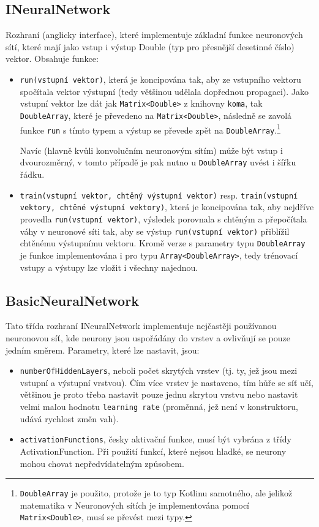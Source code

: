 \documentclass[12pt]{report}			%
\begin{document}
				\subsection{INeuralNetwork}
					Rozhraní (anglicky \gls{interface}), které implementuje základní funkce neuronových sítí, které mají jako vstup i výstup Double (typ pro přesnější desetinné číslo) vektor. Obsahuje funkce:
					\begin{itemize}
						\item \verb!run(vstupní vektor)!, která je koncipována tak, aby ze vstupního vektoru spočítala vektor výstupní (tedy většinou udělala dopřednou propagaci). Jako vstupní vektor lze dát jak \verb!Matrix<Double>! z knihovny \verb!koma!, tak \verb!DoubleArray!, které je převedeno na \verb!Matrix<Double>!, následně se zavolá funkce \verb!run! s tímto typem a výstup se převede zpět na \verb!DoubleArray!.\footnote{\verb!DoubleArray! je použito, protože je to typ Kotlinu samotného, ale jelikož matematika v Neuronových sítích je implementována pomocí \verb!Matrix<Double>!, musí se převést mezi typy.}
						
						Navíc (hlavně kvůli konvolučním neuronovým sítím) může být vstup i dvourozměrný, v tomto případě je pak nutno u \verb!DoubleArray! uvést i šířku řádku.
						\item \verb!train(vstupní vektor, chtěný výstupní vektor)! resp. \verb!train(vstupní vektory, chtěné výstupní vektory)!, která je koncipována tak, aby nejdříve provedla \verb!run(vstupní vektor)!, výsledek porovnala s chtěným a přepočítala váhy v neuronové síti tak, aby se výstup \verb!run(vstupní vektor)! přiblížil chtěnému výstupnímu vektoru. Kromě verze s parametry typu \verb!DoubleArray! je funkce implementována i pro typu \verb!Array<DoubleArray>!, tedy trénovací vstupy a výstupy lze vložit i všechny najednou.
					\end{itemize}
			
				\subsection{BasicNeuralNetwork}
					Tato třída rozhraní INeuralNetwork implementuje nejčastěji používanou neuronovou síť, kde neurony jsou uspořádány do vrstev a ovlivňují se pouze jedním směrem. Parametry, které lze nastavit, jsou:
					\begin{itemize}
						\item \verb!numberOfHiddenLayers!, neboli počet skrytých vrstev (tj. ty, jež jsou mezi vstupní a výstupní vrstvou). Čím více vrstev je nastaveno, tím hůře se síť učí, většinou je proto třeba nastavit pouze jednu skrytou vrstvu nebo nastavit velmi malou hodnotu \verb!learning rate! (proměnná, jež není v konstruktoru, udává rychlost změn vah).
						\item \verb!activationFunctions!, česky aktivační funkce, musí být vybrána z třídy ActivationFunction. Při použití funkcí, které nejsou hladké, se neurony mohou chovat nepředvídatelným způsobem.
					\end{itemize}
					
\end{document}
